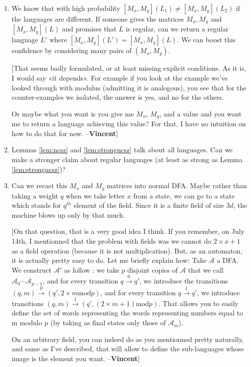\documentclass[english,course]{lecture}
\newcommand{\Mxy}[1]{[M_x,M_y](#1)}
\newcommand\vincent[1]{{\color{blue} [#1 --\textbf{Vincent}]}}
\begin{document}
\begin{enumerate}
\item We know that with high probability $\Mxy {L_1} \neq \Mxy {L_2}$ if the languages are different. If someone gives the matrices $M_x, M_y$ and $\Mxy L$ and promises that $L$ is regular, can we return a regular language $L'$ where $\Mxy {L'} = \Mxy L$. We can boost this confidence by considering many pairs of $(M_x, M_y)$.
\vincent{That seems badly formulated, or at least missing explicit conditions. As it is, I would say «it depends».
For example if you look at the example we've looked through with modulus (admitting it is analogous), you see that for the counter-examples we isolated, the answer is yes, and no for the others.

Or maybe what you want is you give me $M_x$, $M_y$, and a value and you want me to return a language achieving this value?
For that, I have no intuition on how to do that for now.}

\item Lemmas \ref{lem:ncsz} and \ref{lem:strongncsz} talk about all languages. Can we make a stronger claim about regular languages (at least as strong as Lemma \ref{lem:strongncsz})?
\item Can we recast this $M_x$ and $M_y$ matrices into normal DFA. Maybe rather than taking a weight $q$ when we take letter $x$ from a state, we can go to a state which stands for $q^{th}$ element of the field. Since it is a finite field of size $3d$, the machine blows up only by that much.

\vincent{On that question, that is a very good idea I think.
If you remember, on July 14th, I mentionned that the problem with fields was we cannot do $2 \times x +1$ as a field operation (because it is not multiplication). But, as an automaton, it is actually pretty easy to do. Let me briefly explain how: Take $\mathcal{A}$ a DFA. We construct $\mathcal{A'}$ as follow : we take $p$ disjoint copies of $\mathcal{A}$ that we call $\mathcal{A}_0\cdots\mathcal{A}_{p-1}$, and for every transition $q \xrightarrow{0} q'$, we introduce the transitions $(q,m) \xrightarrow{0} (q',2\times m \mathrm{mod} p)$, and for every transition $q \xrightarrow{1} q'$, we introduce transitions $(q,m) \xrightarrow{1} (q',(2\times m + 1) \mathrm{mod} p)$.
That allows you to easily define the set of words representing the words representing numbers equal to m modulo p (by taking as final states only those of $\mathcal{A}_m$).

On an arbitrary field, you can indeed do as you mentionned pretty naturally, and same as I've described, that will allow to define the sub-languages whose image is the element you want.}
\end{enumerate}



\end{document}
